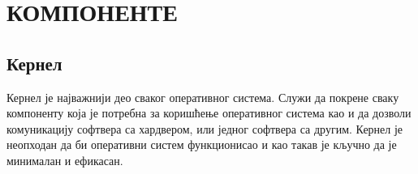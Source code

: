 \documentclass[a4paper,14pt]{article}
\begin{document}
\begin{figure}[h]
	\centering
    \hspace{1cm}
    \hspace{1cm}
    \hspace{1cm}
\end{figure}
\newpage

\section{КОМПОНЕНТЕ}
\subsection{Кернел}
Кернел\cite{kernel} је најважнији део сваког оперативног система. Служи да покрене сваку компоненту која је потребна за коришћење оперативног система као и да дозволи комуникацију софтвера са хардвером, или једног софтвера са другим. Кернел је неопходан да би оперативни систем функционисао и као такав је кључно да је минималан и ефикасан.
\end{document}
